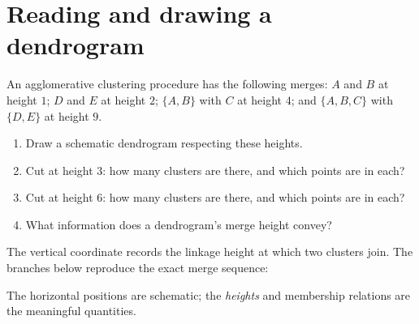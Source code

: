 \section{Reading and drawing a dendrogram}
\label{sec:ex6}
\begin{problem}
An agglomerative clustering procedure has the following merges: $A$ and $B$ at height $1$; $D$ and $E$ at height $2$; $\{A,B\}$ with $C$ at height $4$; and $\{A,B,C\}$ with $\{D,E\}$ at height $9$.
\begin{enumerate}[label=\textbf{(\alph*)}]
\item Draw a schematic dendrogram respecting these heights.
\item Cut at height $3$: how many clusters are there, and which points are in each?
\item Cut at height $6$: how many clusters are there, and which points are in each?
\item What information does a dendrogram's merge height convey?
\end{enumerate}
\end{problem}


The vertical coordinate records the linkage height at which two clusters join. The branches below reproduce the exact merge sequence:
\begin{center}
\end{center}
The horizontal positions are schematic; the \emph{heights} and membership relations are the meaningful quantities.


